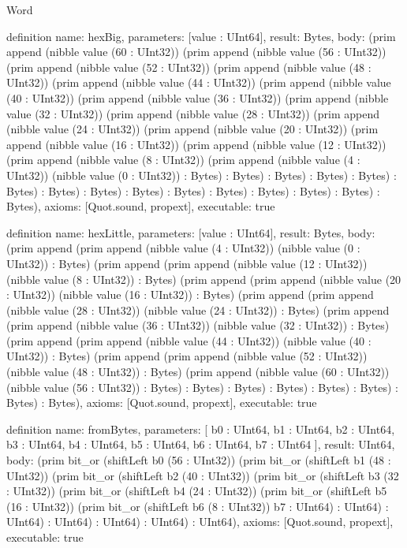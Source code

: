 \begin{lexlean}{Word}
\begin{semanticmodule}
definition{
  name: hexBig,
  parameters: [value : UInt64],
  result: Bytes,
  body: (prim append (nibble value (60 : UInt32)) (prim append (nibble value (56 : UInt32)) (prim append (nibble value (52 : UInt32)) (prim append (nibble value (48 : UInt32)) (prim append (nibble value (44 : UInt32)) (prim append (nibble value (40 : UInt32)) (prim append (nibble value (36 : UInt32)) (prim append (nibble value (32 : UInt32)) (prim append (nibble value (28 : UInt32)) (prim append (nibble value (24 : UInt32)) (prim append (nibble value (20 : UInt32)) (prim append (nibble value (16 : UInt32)) (prim append (nibble value (12 : UInt32)) (prim append (nibble value (8 : UInt32)) (prim append (nibble value (4 : UInt32)) (nibble value (0 : UInt32)) : Bytes) : Bytes) : Bytes) : Bytes) : Bytes) : Bytes) : Bytes) : Bytes) : Bytes) : Bytes) : Bytes) : Bytes) : Bytes) : Bytes) : Bytes),
  axioms: [Quot.sound, propext],
  executable: true
}

definition{
  name: hexLittle,
  parameters: [value : UInt64],
  result: Bytes,
  body: (prim append (prim append (nibble value (4 : UInt32)) (nibble value (0 : UInt32)) : Bytes) (prim append (prim append (nibble value (12 : UInt32)) (nibble value (8 : UInt32)) : Bytes) (prim append (prim append (nibble value (20 : UInt32)) (nibble value (16 : UInt32)) : Bytes) (prim append (prim append (nibble value (28 : UInt32)) (nibble value (24 : UInt32)) : Bytes) (prim append (prim append (nibble value (36 : UInt32)) (nibble value (32 : UInt32)) : Bytes) (prim append (prim append (nibble value (44 : UInt32)) (nibble value (40 : UInt32)) : Bytes) (prim append (prim append (nibble value (52 : UInt32)) (nibble value (48 : UInt32)) : Bytes) (prim append (nibble value (60 : UInt32)) (nibble value (56 : UInt32)) : Bytes) : Bytes) : Bytes) : Bytes) : Bytes) : Bytes) : Bytes) : Bytes),
  axioms: [Quot.sound, propext],
  executable: true
}

definition{
  name: fromBytes,
  parameters: [
    b0 : UInt64,
    b1 : UInt64,
    b2 : UInt64,
    b3 : UInt64,
    b4 : UInt64,
    b5 : UInt64,
    b6 : UInt64,
    b7 : UInt64
  ],
  result: UInt64,
  body: (prim bit_or (shiftLeft b0 (56 : UInt32)) (prim bit_or (shiftLeft b1 (48 : UInt32)) (prim bit_or (shiftLeft b2 (40 : UInt32)) (prim bit_or (shiftLeft b3 (32 : UInt32)) (prim bit_or (shiftLeft b4 (24 : UInt32)) (prim bit_or (shiftLeft b5 (16 : UInt32)) (prim bit_or (shiftLeft b6 (8 : UInt32)) b7 : UInt64) : UInt64) : UInt64) : UInt64) : UInt64) : UInt64) : UInt64),
  axioms: [Quot.sound, propext],
  executable: true
}


\end{semanticmodule}
\end{lexlean}
